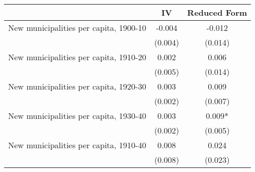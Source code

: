  \begin{tabular}{l*{2}{c}} \toprule
                &\multicolumn{1}{c}{IV}&\multicolumn{1}{c}{Reduced Form}\\
\midrule
New municipalities per capita, 1900-10&   -0.004   &   -0.012   \\
                &  (0.004)   &  (0.014)   \\
\addlinespace
New municipalities per capita, 1910-20&    0.002   &    0.006   \\
                &  (0.005)   &  (0.014)   \\
\addlinespace
New municipalities per capita, 1920-30&    0.003   &    0.009   \\
                &  (0.002)   &  (0.007)   \\
\addlinespace
New municipalities per capita, 1930-40&    0.003   &    0.009*  \\
                &  (0.002)   &  (0.005)   \\
\addlinespace
New municipalities per capita, 1910-40&    0.008   &    0.024   \\
                &  (0.008)   &  (0.023)   \\
       \bottomrule \end{tabular}
